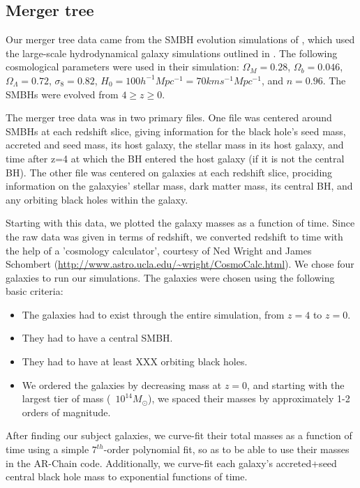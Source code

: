 \documentclass[english, apj]{emulateapj}
\begin{document}
\subsection{Merger tree}
Our merger tree data came from the SMBH evolution simulations of \citet{2015ApJ...799..178K}, which used the large-scale hydrodynamical galaxy simulations outlined in \citet{2011ApJ...741...99C, 2011ApJ...742L..33C, 2012ApJ...753...17C, 2012ApJ...748..121C, 2013ApJ...770..139C}.  The following cosmological parameters were used in their simulation:   $\Omega_M = 0.28$, $\Omega_b = 0.046$, $\Omega_\Lambda = 0.72$, $\sigma_8 = 0.82$, $H_0 = 100h^{-1}Mpc^{-1} = 70 km s^{-1} Mpc^{-1}$, and $n = 0.96$.  The SMBHs were evolved from $4\geq z \geq 0$.

The merger tree data was in two primary files.  One file was centered around SMBHs at each redshift slice, giving information for the black hole's seed mass, accreted and seed mass, its host galaxy, the stellar mass in its host galaxy, and time after z=4 at which the BH entered the host galaxy (if it is not the central BH).  The other file was centered on galaxies at each redshift slice, prociding information on the galaxyies' stellar mass, dark matter mass, its central BH, and any orbiting black holes within the galaxy.

Starting with this data, we plotted the galaxy masses as a function of time.  Since the raw data was given in terms of redshift, we converted redshift to time with the help of a 'cosmology calculator', courtesy of Ned Wright and James Schombert (\url{http://www.astro.ucla.edu/~wright/CosmoCalc.html}).  We chose four galaxies to run our simulations.  The galaxies were chosen using the following basic criteria:
\begin{itemize}
\item The galaxies had to exist through the entire simulation, from $z=4$ to $z=0$.
\item They had to have a central SMBH.
\item They had to have at least XXX orbiting black holes.
\item We ordered the galaxies by decreasing mass at $z=0$, and starting with the largest tier of mass (~$10^{14} M_{\odot}$), we spaced their masses by approximately 1-2 orders of magnitude.
\end{itemize}

After finding our subject galaxies, we curve-fit their total masses as a function of time using a simple $7^{th}$-order polynomial fit, so as to be able to use their masses in the AR-Chain code.  Additionally, we curve-fit each galaxy's accreted+seed central black hole mass to exponential functions of time.
\end{document}
